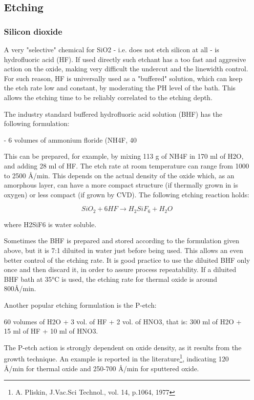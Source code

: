 \subsection{Etching}
\subsubsection{Silicon dioxide}
A very "selective" chemical for SiO2 - i.e. does not etch silicon at all - is hydrofluoric acid (HF). If used directly such etchant has a too fast and aggresive action on the oxide, making very difficult the undercut and the linewidth control. For such reason, HF is universally used as a "buffered" solution, which can keep the etch rate low and constant, by moderating the PH level of the bath. This allows the etching time to be reliably correlated to the etching depth.

The industry standard buffered hydrofluoric acid solution (BHF) has the following formulation:

- 6 volumes of ammonium floride (NH4F, 40%

This can be prepared, for example, by mixing 113 g of NH4F in 170 ml of H2O, and adding 28 ml of HF. The etch rate at room temperature can range from 1000 to 2500 Å/min. This depends on the actual density of the oxide which, as an amorphous layer, can have a more compact structure (if thermally grown in is oxygen) or less compact (if grown by CVD). The following etching reaction holds:

\begin{equation}
SiO_2 + 6HF \rightarrow H_2SiF_6 + H_2O
\end{equation}

where H2SiF6 is water soluble.

Sometimes the BHF is prepared and stored according to the formulation given above, but it is 7:1 diluited in water just before being used. This allows an even better control of the etching rate. It is good practice to use the diluited BHF only once and then discard it, in order to assure process repeatability. If a diluited BHF bath at 35°C is used, the etching rate for thermal oxide is around 800Å/min.

Another popular etching formulation is the P-etch:

60 volumes of H2O + 3 vol. of HF + 2 vol. of HNO3, that is: 300 ml of H2O + 15 ml of HF + 10 ml of HNO3.

The P-etch action is strongly dependent on oxide density, as it results from the growth technique. An example is reported in the literature\footnote{A. Pliskin, J.Vac.Sci Technol., vol. 14, p.1064, 1977}, indicating 120 Å/min for thermal oxide and 250-700 Å/min for sputtered oxide.

